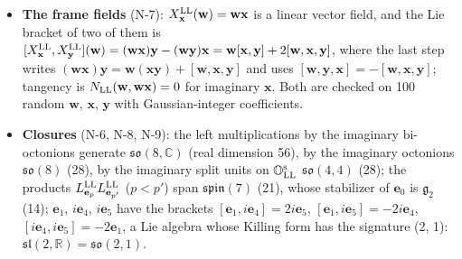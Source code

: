 \documentclass[
  10pt,
]{article}
\begin{document}
\begin{itemize}
  quaternions),
  \(N_{\rm LL}(\mathbf b\,\mathbf e_4)=N_{\rm LL}(\mathbf b_1)-N_{\rm LL}(\mathbf b_2)+2i\,N_{\rm LL}(\mathbf b_1,\mathbf b_2)\):
  \(\mathrm{Re}\,N_{\rm LL}\) and \(\mathrm{Im}\,N_{\rm LL}\) both have
  the signature (4, 4).
\item
  \textbf{The frame fields} (N-7):
  \(X^{\rm LL}_{\mathbf x}(\mathbf w)=\mathbf w\mathbf x\) is a linear
  vector field, and the Lie bracket of two of them is
  \([X^{\rm LL}_{\mathbf x},X^{\rm LL}_{\mathbf y}](\mathbf w)=(\mathbf w\mathbf x)\mathbf y-(\mathbf w\mathbf y)\mathbf x=\mathbf w[\mathbf x,\mathbf y]+2[\mathbf w,\mathbf x,\mathbf y]\),
  where the last step writes
  \((\mathbf w\mathbf x)\mathbf y=\mathbf w(\mathbf x\mathbf y)+[\mathbf w,\mathbf x,\mathbf y]\)
  and uses
  \([\mathbf w,\mathbf y,\mathbf x]=-[\mathbf w,\mathbf x,\mathbf y]\);
  tangency is \(N_{\rm LL}(\mathbf w,\mathbf w\mathbf x)=0\) for
  imaginary \(\mathbf x\). Both are checked on 100 random \(\mathbf w\),
  \(\mathbf x\), \(\mathbf y\) with Gaussian-integer coefficients.
\item
  \textbf{Closures} (N-6, N-8, N-9): the left multiplications by the
  imaginary bi-octonions generate \(\mathfrak{so}(8,\mathbb C)\) (real
  dimension 56), by the imaginary octonions \(\mathfrak{so}(8)\) (28),
  by the imaginary split units on \(\mathbb O^{\rm s}_{\rm LL}\)
  \(\mathfrak{so}(4,4)\) (28); the products
  \(L^{\rm LL}_{\mathbf e_p}L^{\rm LL}_{\mathbf e_{p'}}\) (\(p<p'\))
  span \(\mathfrak{spin}(7)\) (21), whose stabilizer of \(\mathbf e_0\)
  is \(\mathfrak g_2\) (14); \(\mathbf e_1\), \(i\mathbf e_4\),
  \(i\mathbf e_5\) have the brackets
  \([\mathbf e_1,i\mathbf e_4]=2i\mathbf e_5\),
  \([\mathbf e_1,i\mathbf e_5]=-2i\mathbf e_4\),
  \([i\mathbf e_4,i\mathbf e_5]=-2\mathbf e_1\), a Lie algebra whose
  Killing form has the signature (2, 1):
  \(\mathfrak{sl}(2,\mathbb R)=\mathfrak{so}(2,1)\).
\end{itemize}
\end{document}
